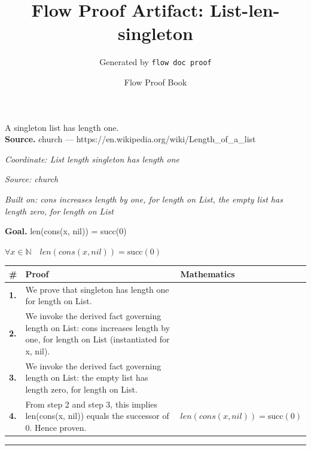 \documentclass[11pt]{article}
\title{Flow Proof Artifact: List-len-singleton}
\author{Generated by \texttt{flow doc proof}}
\date{Flow Proof Book}
\theoremstyle{definition}
\begin{document}
\maketitle
A singleton list has length one.\\[0.5em]
\textbf{Source.} church — https://en.wikipedia.org/wiki/Length\_of\_a\_list\\[0.5em]
\bigskip
{}\par
\smallskip\noindent\textit{Coordinate: List \cdot length \cdot singleton has length one}\par
\smallskip\noindent\textit{Source: church}\par
\smallskip\noindent\textit{Built on: cons increases length by one, for length on List, the empty list has length zero, for length on List}\par
\medskip
\noindent\textbf{Goal.} len(cons(x, nil)) = succ(0)\par
\noindent$\displaystyle \forall x \in \mathbb{N}\quad len(cons(x, nil)) = \mathrm{succ}(0)$\par
\medskip
\noindent
\begin{tabular}{@{} >{\raggedright\arraybackslash}p{} >{\raggedright\arraybackslash}p{} >{\raggedleft\arraybackslash}p{} @{}}
\textbf{\#} & \textbf{Proof} & \textbf{Mathematics} \\
\midrule
\textbf{1.} & We prove that singleton has length one for length on List. & \\[0.45em]
\textbf{2.} & We invoke the derived fact governing length on List: cons increases length by one, for length on List (instantiated for x, nil). & \\[0.45em]
\textbf{3.} & We invoke the derived fact governing length on List: the empty list has length zero, for length on List. & \\[0.45em]
\textbf{4.} & From step 2 and step 3, this implies len(cons(x, nil)) equals the successor of 0. Hence proven. & $\displaystyle len(cons(x, nil)) = \mathrm{succ}(0)$ \\[0.45em]
\bottomrule
\end{tabular}
\label{thm:List-length-singleton_has_length_one}
\par\medskip\hrule
\end{document}
